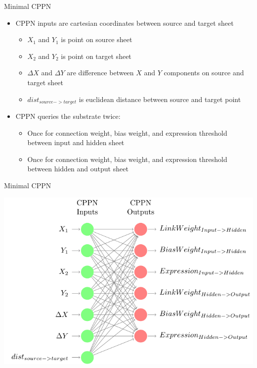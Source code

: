 \documentclass[xcolor=dvipsnames]{beamer}
\newcommand\Fontvi{\fontsize{7}{10}\selectfont}
\begin{document}
	\begin{frame}{Minimal CPPN}
		\begin{itemize}
			\item CPPN inputs are cartesian coordinates between source and target sheet
			\begin{itemize}\Fontvi
				\item $X_1$ and $Y_1$ is point on source sheet
				\item $X_2$ and $Y_2$ is point on target sheet
				\item ${\Delta}X$ and ${\Delta}Y$ are difference between $X$ and $Y$ components on source and target sheet
				\item $dist_{source->target}$ is euclidean distance between source and target point
			\end{itemize}
			\bigskip
			\item CPPN queries the substrate twice:
			\begin{itemize}\Fontvi
				\item Once for connection weight, bias weight, and expression threshold between input and hidden sheet
				\item Once for connection weight, bias weight, and expression threshold between hidden and output sheet
			\end{itemize}
		\end{itemize}		
	\end{frame}
	
	\begin{frame}{Minimal CPPN}
		\begin{center}
			\includegraphics[width=\textwidth,height=0.7\textheight,keepaspectratio]{MinimalCppn/MinimalCppn}
		\end{center}
	\end{frame}
	
\end{document}
